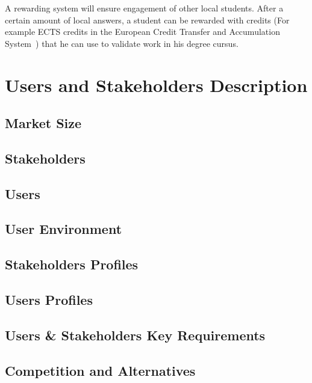 \documentclass[12pt,a4paper,oneside, titlepage]{article}
\begin{document}
		A rewarding system will ensure engagement of other local students. After a certain amount 
		of local answers, a student can be rewarded with credits (For example ECTS credits in the European 
		Credit Transfer and Accumulation System~\cite{ectsWiki}) that he 
		can use to validate work in his degree cursus. 
		
	\section{Users and Stakeholders Description}
	\subsection{Market Size}
	\subsection{Stakeholders}
	\subsection{Users}
	\subsection{User Environment}
	\subsection{Stakeholders Profiles}
	\subsection{Users Profiles}
	\subsection{Users \& Stakeholders Key Requirements}
	\subsection{Competition and Alternatives}

    \newpage
    {}
    
\end{document}
